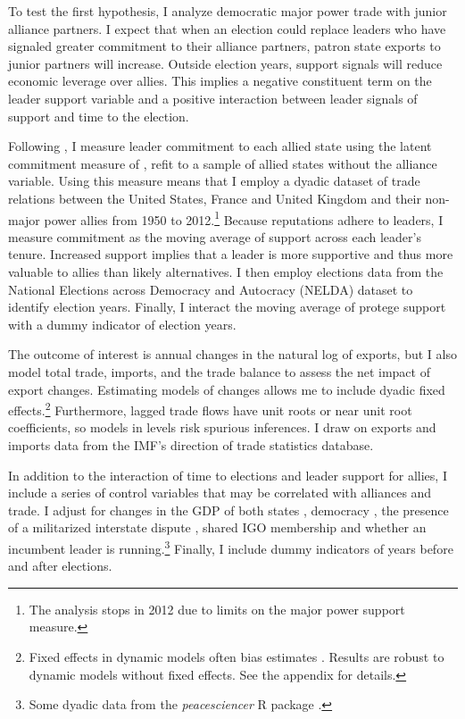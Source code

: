 \documentclass[12pt]{article}
\begin{document}
To test the first hypothesis, I analyze democratic major power trade with junior alliance partners. 
I expect that when an election could replace leaders who have signaled greater commitment to their alliance partners, patron state exports to junior partners will increase.
Outside election years, support signals will reduce economic leverage over allies.
This implies a negative constituent term on the leader support variable and a positive interaction between leader signals of support and time to the election.


Following \citet{DigiuseppeShea2021}, I measure leader commitment to each allied state using the latent commitment measure of \citet{McManusNieman2019}, refit to a sample of allied states without the alliance variable. 
Using this measure means that I employ a dyadic dataset of trade relations between the United States, France and United Kingdom and their non-major power allies from 1950 to 2012.\footnote{The analysis stops in 2012 due to limits on the major power support measure.}
Because reputations adhere to leaders, I measure commitment as the moving average of support across each leader's tenure. 
Increased support implies that a leader is more supportive and thus more valuable to allies than likely alternatives.
I then employ elections data from the National Elections across Democracy and Autocracy (NELDA) dataset \citep{HydeMarinov2012} to identify election years.
Finally, I interact the moving average of protege support with a dummy indicator of election years.


The outcome of interest is annual changes in the natural log of exports, but I also model total trade, imports, and the trade balance to assess the net impact of export changes.
Estimating models of changes allows me to include dyadic fixed effects.\footnote{Fixed effects in dynamic models often bias estimates \citep{Nickell1981}. Results are robust to dynamic models without fixed effects. See the appendix for details.}
Furthermore, lagged trade flows have unit roots or near unit root coefficients, so models in levels risk spurious inferences.
I draw on exports and imports data from the IMF's direction of trade statistics database.


In addition to the interaction of time to elections and leader support for allies, I include a series of control variables that may be correlated with alliances and trade. 
I adjust for changes in the GDP of both states \citep{FouquinHugot2016}, democracy \citep{Marquez2016}, the presence of a militarized interstate dispute \citep{Gibleretal2016}, shared IGO membership \citep{Pevehouseetal2020} and whether an incumbent leader is running.\footnote{Some dyadic data from the \textit{peacesciencer} \textsf{R} package \citep{peacesciencer-package}.}
Finally, I include dummy indicators of years before and after elections.
\end{document}
